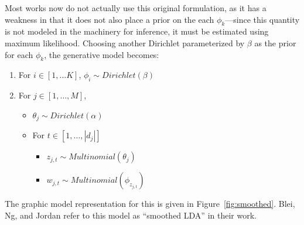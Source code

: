 \documentclass[11pt]{article}
\begin{document}
Most works now do not actually use this original formulation, as it has a
weakness in that it does not also place a prior on the each
$\phi_k$---since this quantity is not modeled in the machinery for
inference, it must be estimated using maximum likelihood. Choosing another
Dirichlet parameterized by $\beta$ as the prior for each $\phi_k$, the
generative model becomes:

\begin{enumerate}
  \item For $i\in[1,\ldots K]$, $\phi_i \sim Dirichlet(\beta)$
  \item For $j\in[1, \ldots, M]$,
    \begin{itemize}
      \item $\theta_j \sim Dirichlet(\alpha)$
      \item For $t \in [1,\ldots, |d_j|]$
        \begin{itemize}
          \item $z_{j,t} \sim Multinomial(\theta_j)$
          \item $w_{j,t} \sim Multinomial(\phi_{z_{j,t}})$
        \end{itemize}
    \end{itemize}
\end{enumerate}

The graphic model representation for this is given in
Figure~\ref{fig:smoothed}. Blei, Ng, and Jordan refer to this model as
``smoothed LDA'' in their work.
\end{document}
